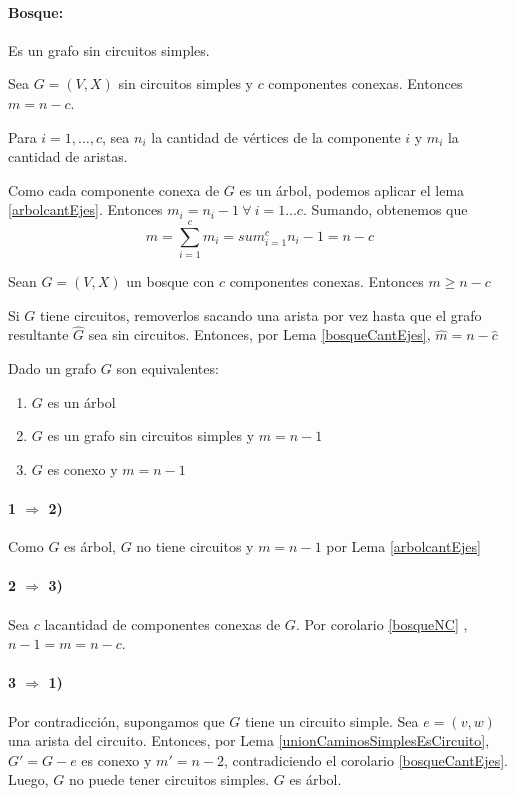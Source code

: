 \paragraph{Bosque:} Es un grafo sin circuitos simples.
\begin{coro}\label{bosqueCantEjes}
	Sea \(G = (V,X)\) sin circuitos simples y \(c\) componentes conexas. Entonces \(m = n - c\).
\end{coro}
\begin{demo}
	Para \(i=1,\dots,c\), sea \(n_i\) la cantidad de vértices de la componente \(i\) y \(m_i\) la cantidad de aristas.

	Como cada componente conexa de \(G\) es un árbol, podemos aplicar el lema \ref{arbolcantEjes}. Entonces \(m_i = n_i - 1~\forall~i=1\dots c\). Sumando, obtenemos que \[ m = \sum_{i=1}^{c}m_i = sum_{i=1}^{c}n_i - 1 = n - c\]
\end{demo}

\begin{coro}\label{bosqueNC}
	Sean \(G = (V, X)\) un bosque con \(c\) componentes conexas. Entonces \(m \geq n -c\)
\end{coro}
\begin{demo}
	Si \(G\) tiene circuitos, removerlos sacando una arista por vez hasta que el grafo resultante \(\hat{G}\) sea sin circuitos. Entonces, por Lema \ref{bosqueCantEjes}, \(\hat{m} = n - \hat{c}\)
\end{demo}

\begin{theorem}
	Dado un grafo \(G\) son equivalentes:
	\begin{enumerate}
		\item \(G\) es un árbol
		\item \(G\) es un grafo sin circuitos simples y \(m = n-1\)
		\item \(G\) es conexo y \(m = n - 1\)
	\end{enumerate}
\end{theorem}
\begin{demo}
	\paragraph{1 \(\Rightarrow\) 2)} Como \(G\) es árbol, \(G\) no tiene circuitos y \(m = n - 1\) por Lema \ref{arbolcantEjes}
	\paragraph{2 \(\Rightarrow\) 3)} Sea \(c\) lacantidad de componentes conexas de \(G\). Por corolario \ref{bosqueNC} , \(n - 1 = m = n - c\).
	\paragraph{3 \(\Rightarrow\)  1)} Por contradicción, supongamos que \(G\) tiene un circuito simple. Sea \(e = (v,w)\) una arista del circuito. Entonces, por Lema \ref{unionCaminosSimplesEsCircuito}, \(G' = G - e\) es conexo y \(m' = n - 2\), contradiciendo el corolario \ref{bosqueCantEjes}. Luego, \(G\) no puede tener circuitos simples. \(G\) es árbol.
\end{demo}

